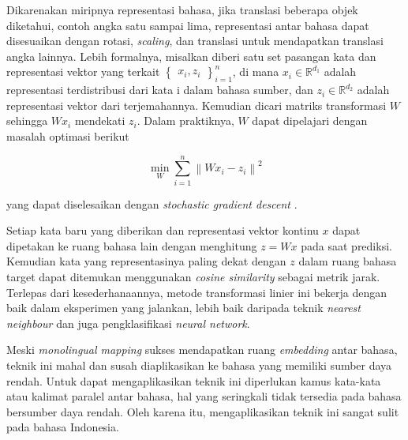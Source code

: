     Dikarenakan miripnya representasi bahasa, jika translasi beberapa objek diketahui, contoh angka satu sampai lima, representasi antar bahasa dapat disesuaikan dengan rotasi, \textit{scaling}, dan translasi untuk mendapatkan translasi angka lainnya. Lebih formalnya, misalkan diberi satu set pasangan kata dan representasi vektor yang terkait \begin{math} \begin{Bmatrix} {x_{i}, z_{i}} \end{Bmatrix}_{i=1}^{n} \end{math}, di mana \(x_{i}\in\mathbb{R}^{d_{1}}\) adalah representasi terdistribusi dari kata i dalam bahasa sumber, dan \(z_{i}\in\mathbb{R}^{d_{2}}\) adalah representasi vektor dari terjemahannya. Kemudian dicari matriks transformasi \( W\) sehingga \(W x_{i}\) mendekati \(z_{i}\). Dalam praktiknya, \(W\) dapat dipelajari dengan masalah optimasi berikut

    \begin{equation}
        \min_{W}\sum_{i=1}^{n}\left \| Wx_i-z_i \right \|^2
        \label{eq:2}
    \end{equation}

    yang dapat diselesaikan dengan \textit{stochastic gradient descent} \parencite{MikolovExploiting}.

    Setiap kata baru yang diberikan dan representasi vektor kontinu \(x\) dapat dipetakan ke ruang bahasa lain dengan menghitung \(z = W x\) pada saat prediksi. Kemudian kata yang representasinya paling dekat dengan \(z\) dalam ruang bahasa target dapat ditemukan menggunakan \textit{cosine similarity} sebagai metrik jarak. Terlepas dari kesederhanaannya, metode transformasi linier ini bekerja dengan baik dalam eksperimen yang \parencite{MikolovExploiting} jalankan, lebih baik daripada teknik \textit{nearest neighbour} dan juga pengklasifikasi \textit{neural network}.

    Meski \textit{monolingual mapping} sukses mendapatkan ruang \textit{embedding} antar bahasa, teknik ini mahal dan susah diaplikasikan ke bahasa yang memiliki sumber daya rendah. Untuk dapat mengaplikasikan teknik ini diperlukan kamus kata-kata atau kalimat paralel antar bahasa, hal yang seringkali tidak tersedia pada bahasa bersumber daya rendah. Oleh karena itu, mengaplikasikan teknik ini sangat sulit pada bahasa Indonesia. 

